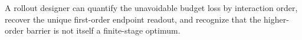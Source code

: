 A rollout designer can quantify the unavoidable budget loss by interaction order, recover the unique first-order endpoint readout, and recognize that the higher-order barrier is not itself a finite-stage optimum.